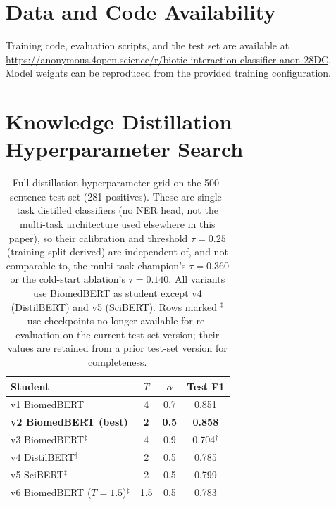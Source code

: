 \documentclass[11pt,twocolumn]{article}
\begin{document}
\section*{Data and Code Availability}

Training code, evaluation scripts, and the test set are available at
\url{https://anonymous.4open.science/r/biotic-interaction-classifier-anon-28DC}.
Model weights can be reproduced from the provided training configuration.




\clearpage
\onecolumn
\appendix

\section{Knowledge Distillation Hyperparameter Search}
\label{app:distillation}

\begin{table}[H]
\centering
\caption{Full distillation hyperparameter grid on the 500-sentence test set
(281 positives). These are single-task distilled classifiers (no NER head,
not the multi-task architecture used elsewhere in this paper), so their
calibration and threshold $\tau{=}0.25$ (training-split-derived) are independent
of, and not comparable to, the multi-task champion's $\tau{=}0.360$ or the
cold-start ablation's $\tau{=}0.140$.
All variants use BiomedBERT as student except v4 (DistilBERT)
and v5 (SciBERT). Rows marked $^{\ddagger}$ use checkpoints no longer
available for re-evaluation on the current test set version; their values
are retained from a prior test-set version for completeness.}
\label{tab:distillation_full}
\begin{tabular}{lccc}
\toprule
\textbf{Student} & $T$ & $\alpha$ & \textbf{Test F1} \\
\midrule
v1 BiomedBERT & 4 & 0.7 & 0.851 \\
\rowcolor{bestrow}
\textbf{v2 BiomedBERT (best)} & \textbf{2} & \textbf{0.5} & \textbf{0.858} \\
v3 BiomedBERT$^{\ddagger}$ & 4 & 0.9 & 0.704$^{\dagger}$ \\
v4 DistilBERT$^{\ddagger}$ & 2 & 0.5 & 0.785 \\
v5 SciBERT$^{\ddagger}$    & 2 & 0.5 & 0.799 \\
v6 BiomedBERT ($T{=}1.5$)$^{\ddagger}$ & 1.5 & 0.5 & 0.783 \\
\bottomrule
\end{tabular}

\smallskip{}
\end{table}
\end{document}
